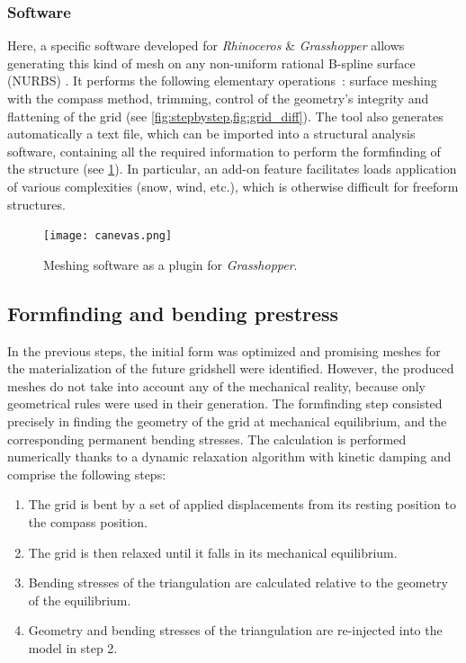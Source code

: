 \subsubsection{Software}
Here, a specific software developed for \emph{Rhinoceros} \& \emph{Grasshopper} allows generating this kind of mesh on any non-uniform rational B-spline surface (NURBS) \cite{DuPeloux2011}. It performs the following elementary operations~: surface meshing with the compass method, trimming, control of the geometry’s integrity and flattening of the grid (see \cref{fig:stepbystep,fig:grid_diff}). The tool also generates automatically a text file, which can be imported into a structural analysis software, containing all the required information to perform the formfinding of the structure (see \cref{fig:canevas}). In particular, an add-on feature facilitates loads application of various complexities (snow, wind, etc.), which is otherwise difficult for freeform structures.
\begin{figure}[h]
	\centering
	\texttt{[image: canevas.png]}
	\caption{Meshing software as a plugin for \emph{Grasshopper}.}
	\label{fig:canevas}
\end{figure}

\subsection{Formfinding and bending prestress}
In the previous steps, the initial form was optimized and promising meshes for the materialization of the future gridshell were identified. However, the produced meshes do not take into account any of the mechanical reality, because only geometrical rules were used in their generation. The formfinding step consisted precisely in finding the geometry of the grid at mechanical equilibrium, and the corresponding permanent bending stresses. The calculation is performed numerically thanks to a dynamic relaxation algorithm with kinetic damping \cite{Barnes1975} and comprise the following steps:
\begin{enumerate}
\item The grid is bent by a set of applied displacements from its resting position to the compass position.
\item The grid is then relaxed until it falls in its mechanical equilibrium.
\item Bending stresses of the triangulation are calculated relative to the geometry of the equilibrium.
\item Geometry and bending stresses of the triangulation are re-injected into the model in step 2.
\end{enumerate}


